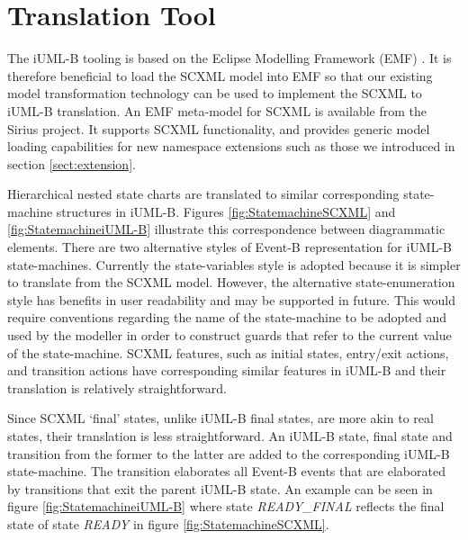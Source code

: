 
\section{Translation Tool}

The iUML-B tooling is based on the Eclipse Modelling Framework (EMF) \cite{steinberg2009emf}. 
It is therefore beneficial to load the SCXML model into EMF so that 
our existing model transformation technology can be used to 
implement the SCXML to iUML-B translation. An EMF meta-model for SCXML 
is available from the Sirius \cite{siriuswebsite}
project. It supports SCXML functionality, and provides generic model
loading capabilities for new namespace extensions such as those we 
introduced in section \ref{sect:extension}.

Hierarchical nested state charts are translated to similar corresponding  state-machine structures in iUML-B.  
Figures \ref{fig:StatemachineSCXML} and \ref{fig:StatemachineiUML-B} illustrate this correspondence between diagrammatic elements. 
There are two alternative styles of 
Event-B representation for iUML-B state-machines.  Currently the state-variables 
style is adopted because it is simpler to translate from the SCXML model. 
However, the alternative state-enumeration style has benefits in user readability 
and may be supported in future. This would  require conventions regarding 
the name of the state-machine  to be adopted and used by the modeller in order 
to construct guards that refer to the current value of the state-machine.
SCXML features, such as initial states, entry/exit actions, and transition 
actions have corresponding similar features in iUML-B and their translation 
is relatively straightforward. 

Since SCXML `final' states, unlike iUML-B  final states, are more akin to real states, their translation is less straightforward. 
An iUML-B state, final state and transition from the former to the latter are  added to the corresponding iUML-B state-machine. 
The transition elaborates  all Event-B events that are elaborated by transitions that exit the parent  iUML-B state. 
An example can be seen in figure \ref{fig:StatemachineiUML-B} where state \emph{READY\_FINAL} reflects the final state of state \emph{READY} in figure \ref{fig:StatemachineSCXML}.

